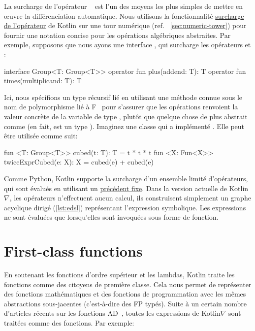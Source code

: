 La surcharge de l'opérateur \noindent~\citep{corliss1993operator} est l'un des moyens les plus simples de mettre en œuvre la différenciation automatique. Nous utilisons la fonctionnalité \href{https://kotlinlang.org/docs/reference/operator-overloading.html}{surcharge de l'opérateur} de Kotlin sur une tour numérique (ref. ~\autoref{sec:numeric-tower}) pour fournir une notation concise pour les opérations algébriques abstraites. Par exemple, supposons que nous ayons une interface , qui surcharge les opérateurs \inline{+} et \inline{*}:
%
\begin{kotlinlisting}
interface Group<T: Group<T>> {
    operator fun plus(addend: T): T
    operator fun times(multiplicand: T): T
}
\end{kotlinlisting}
%
Ici, nous spécifions un type récursif lié en utilisant une méthode connue sous le nom de polymorphisme lié à F~\citep{canning1989f} pour s'assurer que les opérations renvoient la valeur concrète de la variable de type , plutôt que quelque chose de plus abstrait comme  (en fait,  est un type ). Imaginez une classe  qui a implémenté . Elle peut être utilisée comme suit:
%
\begin{kotlinlisting}
fun <T: Group<T>> cubed(t: T): T = t * t * t
fun <X: Fun<X>> twiceExprCubed(e: X): X = cubed(e) + cubed(e)
\end{kotlinlisting}
%
Comme \href{https://docs.python.org/3/reference/datamodel.html#special-method-names}{Python}, Kotlin supporte la surcharge d'un ensemble limité d'opérateurs, qui sont évalués en utilisant un \href{https://kotlinlang.org/docs/reference/grammar.html#precedence}{précédent fixe}. Dans la version actuelle de Kotlin$\nabla$, les opérateurs n'effectuent aucun calcul, ils construisent simplement un graphe acyclique dirigé (\autoref{lst:edsl}) représentant l'expression symbolique. Les expressions ne sont évaluées que lorsqu'elles sont invoquées sous forme de fonction.

\section{First-class functions}\label{sec:first-class-functions}

En soutenant les fonctions d'ordre supérieur et les lambdas, Kotlin traite les fonctions comme des citoyens de première classe. Cela nous permet de représenter des fonctions mathématiques et des fonctions de programmation avec les mêmes abstractions sous-jacentes (c'est-à-dire des FP typés). Suite à un certain nombre d'articles récents sur les fonctions AD~\citep{pearlmutter2008reverse,wang2018backpropagation}, toutes les expressions de Kotlin$\nabla$ sont traitées comme des fonctions. Par exemple:

